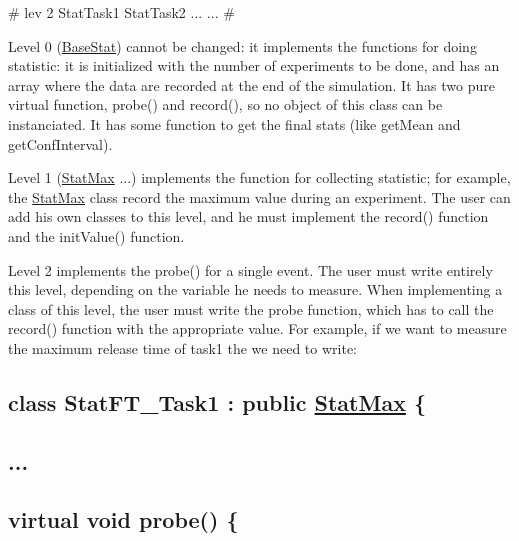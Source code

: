 \begin{DoxyPre}\# lev 2 StatTask1 StatTask2  ...     ...           
\#
\end{DoxyPre}
 Level 0 (\hyperlink{classMetaSim_1_1BaseStat}{Base\+Stat}) cannot be changed\+: it implements the functions for doing statistic\+: it is initialized with the number of experiments to be done, and has an array where the data are recorded at the end of the simulation. It has two pure virtual function, probe() and record(), so no object of this class can be instanciated. It has some function to get the final stats (like get\+Mean and get\+Conf\+Interval).

Level 1 (\hyperlink{classMetaSim_1_1StatMax}{Stat\+Max} ...) implements the function for collecting statistic; for example, the \hyperlink{classMetaSim_1_1StatMax}{Stat\+Max} class record the maximum value during an experiment. The user can add his own classes to this level, and he must implement the record() function and the init\+Value() function.

Level 2 implements the probe() for a single event. The user must write entirely this level, depending on the variable he needs to measure. When implementing a class of this level, the user must write the probe function, which has to call the record() function with the appropriate value. For example, if we want to measure the maximum release time of task1 the we need to write\+: 
\begin{DoxyPre}
\subsection*{class StatFT\_Task1 : public \hyperlink{classMetaSim_1_1StatMax}{StatMax} \{}\end{DoxyPre}



\begin{DoxyPre}
\subsection*{...}\end{DoxyPre}



\begin{DoxyPre}
\subsection*{virtual void probe() \{}\end{DoxyPre}



